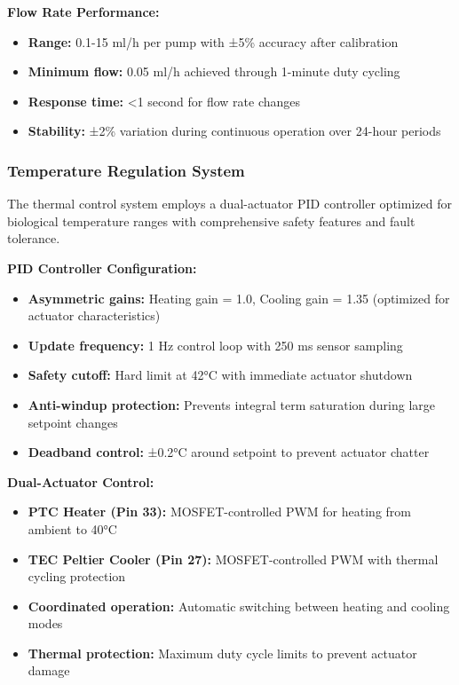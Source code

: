 \textbf{Flow Rate Performance:}
\begin{itemize}
\item \textbf{Range:} 0.1-15 ml/h per pump with ±5\% accuracy after calibration
\item \textbf{Minimum flow:} 0.05 ml/h achieved through 1-minute duty cycling
\item \textbf{Response time:} <1 second for flow rate changes
\item \textbf{Stability:} ±2\% variation during continuous operation over 24-hour periods
\end{itemize}

\subsubsection{Temperature Regulation System}

The thermal control system employs a dual-actuator PID controller optimized for biological temperature ranges with comprehensive safety features and fault tolerance.

\textbf{PID Controller Configuration:}
\begin{itemize}
\item \textbf{Asymmetric gains:} Heating gain = 1.0, Cooling gain = 1.35 (optimized for actuator characteristics)
\item \textbf{Update frequency:} 1 Hz control loop with 250 ms sensor sampling
\item \textbf{Safety cutoff:} Hard limit at 42°C with immediate actuator shutdown
\item \textbf{Anti-windup protection:} Prevents integral term saturation during large setpoint changes
\item \textbf{Deadband control:} ±0.2°C around setpoint to prevent actuator chatter
\end{itemize}

\textbf{Dual-Actuator Control:}
\begin{itemize}
\item \textbf{PTC Heater (Pin 33):} MOSFET-controlled PWM for heating from ambient to 40°C
\item \textbf{TEC Peltier Cooler (Pin 27):} MOSFET-controlled PWM with thermal cycling protection
\item \textbf{Coordinated operation:} Automatic switching between heating and cooling modes
\item \textbf{Thermal protection:} Maximum duty cycle limits to prevent actuator damage
\end{itemize}

